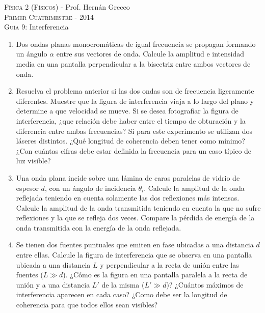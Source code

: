\documentclass[11pt,spanish,a4paper]{article}
\begin{document}
\begin{center}
	\textsc{\large Física 2 (Físicos)} - Prof. Hernán Grecco\\
	\textsc{\large Primer Cuatrimestre - 2014}\\
	\textsc{\large Guía 9:}	Interferencia
\end{center}



\begin{enumerate}
	\item Dos ondas planas monocromáticas de igual frecuencia se propagan formando un ángulo \( \alpha \) entre sus vectores de onda.
	Calcule la amplitud e intensidad media en una pantalla perpendicular a la bisectriz entre ambos vectores de onda.


\item Resuelva el problema anterior si las dos ondas son de frecuencia ligeramente diferentes.
	Muestre que la figura de interferencia viaja a lo largo del plano y determine a que	velocidad se mueve.
	Si se desea fotografiar la figura de interferencia, ¿que relación debe haber entre el tiempo de obturación y la diferencia entre ambas frecuencias?
	Si para este experimento se utilizan dos láseres distintos.
	¿Qué longitud de coherencia deben tener como mínimo?
	¿Con cuántas cifras debe estar definida la frecuencia para un caso típico de luz visible?

	
\item Una onda plana incide sobre una lámina de caras paralelas de vidrio de espesor \(d \), con un ángulo de incidencia \(\theta_i \).
	Calcule la amplitud de la onda reflejada teniendo en cuenta solamente las dos reflexiones más intensas.
	Calcule la amplitud de la onda transmitida teniendo en cuenta la que no sufre reflexiones y la que se refleja dos veces.
	Compare la pérdida de energía de la onda transmitida con la energía de la onda reflejada.


\item Se tienen dos fuentes puntuales que emiten en fase ubicadas a una distancia \(d \) entre ellas.
	Calcule la figura de interferencia que se observa en una pantalla ubicada a una distancia \(L \) y perpendicular a la recta de unión entre las fuentes (\(L \gg d \)).
	¿Cómo es la figura en una pantalla paralela a la recta de unión y a una distancia \(L' \) de la misma (\( L' \gg d \))?
	¿Cuántos máximos de interferencia aparecen en cada caso?
	¿Como debe ser la longitud de coherencia para que todos ellos sean visibles?


\end{enumerate}
\end{document}
